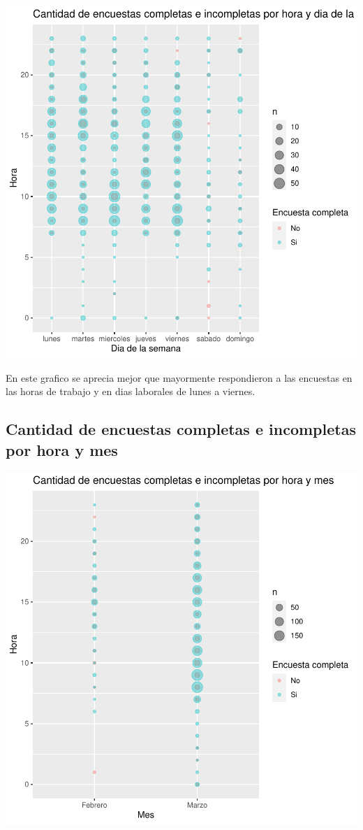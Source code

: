 \documentclass{article}
\begin{document}
\includegraphics{seguimientov3-040}

En este grafico se aprecia mejor que mayormente respondieron a las encuestas en las horas de trabajo y en dias laborales de lunes a viernes.

\subsection{Cantidad de encuestas completas e incompletas por hora y mes}

\includegraphics{seguimientov3-041}
\end{document}
